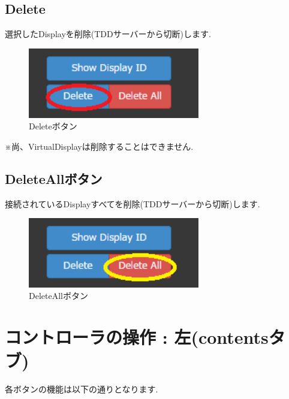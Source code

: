 \documentclass[a4paper,10pt,oneside]{jsbook}
\begin{document}
\subsection{Delete}
選択したDisplayを削除(TDDサーバーから切断)します.\\
\begin{figure}[htbp]
	\begin{center}
		\includegraphics[width=7.5cm]{image/3Button2.PNG}
	\end{center}
	\caption{Deleteボタン}
	\label{fig:deletebutton}
\end{figure}

※尚、VirtualDisplayは削除することはできません.\\



\subsection{DeleteAllボタン}
接続されているDisplayすべてを削除(TDDサーバーから切断)します.\\

\begin{figure}[htbp]
	\begin{center}
		\includegraphics[width=7.5cm]{image/3Button3.PNG}
	\end{center}
	\caption{DeleteAllボタン}
	\label{fig:deleteallbutton}
\end{figure}

\newpage


\section{コントローラの操作 : 左(contentsタブ)}
各ボタンの機能は以下の通りとなります.\\
\end{document}
